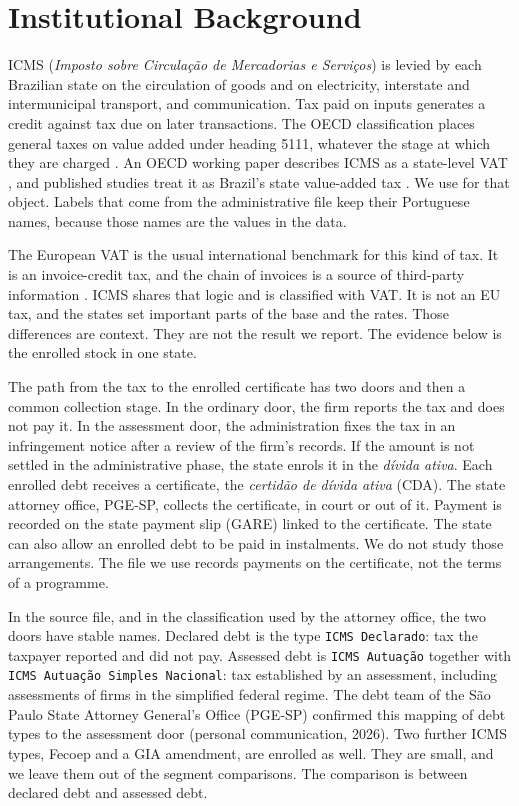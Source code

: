 \section{Institutional Background}\label{sec:background}

ICMS (\emph{Imposto sobre Circula\c{c}\~ao de Mercadorias e Servi\c{c}os}) is levied by each Brazilian state on the circulation of goods and on electricity, interstate and intermunicipal transport, and communication.
Tax paid on inputs generates a credit against tax due on later transactions.
The OECD classification places general taxes on value added under heading 5111, whatever the stage at which they are charged \citep{oecd2026guide}.
An OECD working paper describes ICMS as a state-level VAT \citep{arnold2025}, and published studies treat it as Brazil's state value-added tax \citep{gomes2024,cabello2020}.
We use \vat{} for that object.
Labels that come from the administrative file keep their Portuguese names, because those names are the values in the data.

The European VAT is the usual international benchmark for this kind of tax.
It is an invoice-credit tax, and the chain of invoices is a source of third-party information \citep{keen2006}.
ICMS shares that logic and is classified with VAT.
It is not an EU tax, and the states set important parts of the base and the rates.
Those differences are context.
They are not the result we report.
The evidence below is the enrolled stock in one state.

The path from the tax to the enrolled certificate has two doors and then a common collection stage.
In the ordinary door, the firm reports the tax and does not pay it.
In the assessment door, the administration fixes the tax in an infringement notice after a review of the firm's records.
If the amount is not settled in the administrative phase, the state enrols it in the \emph{d\'ivida ativa}.
Each enrolled debt receives a certificate, the \emph{certid\~ao de d\'ivida ativa} (CDA).
The state attorney office, PGE-SP, collects the certificate, in court or out of it.
Payment is recorded on the state payment slip (GARE) linked to the certificate.
The state can also allow an enrolled debt to be paid in instalments.
We do not study those arrangements.
The file we use records payments on the certificate, not the terms of a programme.

In the source file, and in the classification used by the attorney office, the two doors have stable names.
Declared debt is the type \texttt{ICMS Declarado}: tax the taxpayer reported and did not pay.
Assessed debt is \texttt{ICMS Autua\c{c}\~ao} together with \texttt{ICMS Autua\c{c}\~ao Simples Nacional}: tax established by an assessment, including assessments of firms in the simplified federal regime.
The debt team of the São Paulo State Attorney General's Office (PGE-SP) confirmed this mapping of debt types to the assessment door (personal communication, 2026).
Two further ICMS types, Fecoep and a GIA amendment, are enrolled as well.
They are small, and we leave them out of the segment comparisons.
The comparison is between declared debt and assessed debt.
